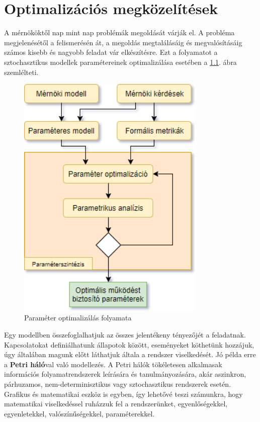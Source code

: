 \chapter{Optimalizációs megközelítések}
\label{sec:optimalizacios-megkozelitesek}

A mérnököktől nap mint nap problémák megoldását várják el. A probléma megjelenésétől a felismerésén át, a megoldás megtalálásáig és megvalósításáig számos kisebb és nagyobb feladat vár elkészítésre. Ezt a folyamatot a sztochasztikus modellek paramétereinek optimalizálása esetében a \ref{fig:folyamat}. ábra szemlélteti.

\begin{figure}[!ht]
	\centering
	\includegraphics[width=90mm, keepaspectratio]{figures/optmeg.png}
	\caption{Paraméter optimalizálás folyamata}
	\label{fig:folyamat}
\end{figure}

Egy modellben összefoglalhatjuk az összes jelentékeny tényezőjét a feladatnak. Kapcsolatokat definiálhatunk állapotok között, eseményeket köthetünk hozzájuk, úgy általában magunk előtt láthatjuk általa a rendszer viselkedését. Jó példa erre a \textbf{Petri háló}val való modellezés. A Petri hálók tökéletesen alkalmasak információs folyamatrendszerek leírására és tanulmányozására, akár aszinkron, párhuzamos, nem-determinisztikus vagy sztochasztikus rendszerek esetén. Grafikus és matematikai eszköz is egyben, így lehetővé teszi számunkra, hogy matematikai viselkedéssel ruházzuk fel a rendszerünket, egyenlőségekkel, egyenletekkel, valószínűségekkel, paraméterekkel.\cite{PetriCikk}


